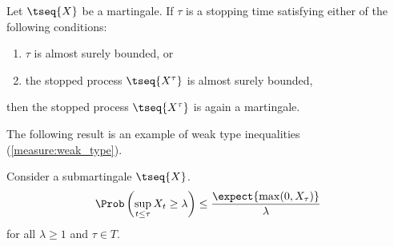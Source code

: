     \begin{theorem}
        Let $\tseq{X}$ be a martingale. If $\tau$ is a stopping time satisfying either of the following conditions:
        \begin{enumerate}
            \item $\tau$ is almost surely bounded, or
            \item the stopped process $\tseq{X^\tau}$ is almost surely bounded,
        \end{enumerate}
        then the stopped process $\tseq{X^\tau}$ is again a martingale.
    \end{theorem}

    The following result is an example of weak type inequalities (\cref{measure:weak_type}).
    \begin{property}\label{prob:doob_inequality}
        Consider a \cdlg submartingale $\tseq{X}$.
        \begin{gather}
            \Prob\left(\sup_{t\leq\tau}X_t\geq\lambda\right)\leq\frac{\expect{\max(0,X_\tau)}}{\lambda}
        \end{gather}
        for all $\lambda\geq1$ and $\tau\in T$.
    \end{property}

